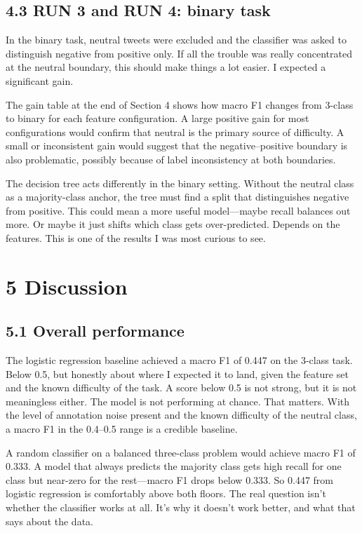 \documentclass[12pt]{article}
\begin{document}
\subsection*{4.3 RUN 3 and RUN 4: binary task}



In the binary task, neutral tweets were excluded and the classifier was asked to distinguish negative from positive only. If all the trouble was really concentrated at the neutral boundary, this should make things a lot easier. I expected a significant gain.

The gain table at the end of Section 4 shows how macro F1 changes from 3-class to binary for each feature configuration. A large positive gain for most configurations would confirm that neutral is the primary source of difficulty. A small or inconsistent gain would suggest that the negative--positive boundary is also problematic, possibly because of label inconsistency at both boundaries.

The decision tree acts differently in the binary setting. Without the neutral class as a majority-class anchor, the tree must find a split that distinguishes negative from positive. This could mean a more useful model---maybe recall balances out more. Or maybe it just shifts which class gets over-predicted. Depends on the features. This is one of the results I was most curious to see.



\section*{5 Discussion}



\subsection*{5.1 Overall performance}



The logistic regression baseline achieved a macro F1 of 0.447 on the 3-class task. Below 0.5, but honestly about where I expected it to land, given the feature set and the known difficulty of the task. A score below 0.5 is not strong, but it is not meaningless either. The model is not performing at chance. That matters. With the level of annotation noise present and the known difficulty of the neutral class, a macro F1 in the 0.4--0.5 range is a credible baseline.

A random classifier on a balanced three-class problem would achieve macro F1 of 0.333. A model that always predicts the majority class gets high recall for one class but near-zero for the rest---macro F1 drops below 0.333. So 0.447 from logistic regression is comfortably above both floors. The real question isn't whether the classifier works at all. It's why it doesn't work better, and what that says about the data.
\end{document}
